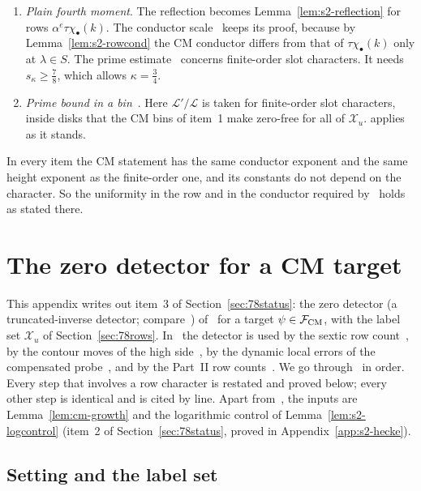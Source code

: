 \documentclass[11pt]{article}
\numberwithin{equation}{section}
\begin{document}
\begin{enumerate}
 functional equation of the finite-order numerator. They are unchanged.
\item \emph{Plain fourth moment}. The reflection \cite[Section~18.1]{OAI78} becomes Lemma~\ref{lem:s2-reflection} for rows
 $\alpha^e\tau\chi_\bullet(k)$. The conductor scale~\cite[eq.~(18.7)]{OAI78} keeps its proof, because by
 Lemma~\ref{lem:s2-rowcond} the CM conductor differs from that of $\tau\chi_\bullet(k)$ only at $\lambda\in S$.
 The prime estimate~\cite[eq.~(18.11)]{OAI78} concerns finite-order slot characters. It needs
 $s_\kappa\ge\frac78$, which allows $\kappa=\frac34$.
\item \emph{Prime bound in a bin}~\cite[Lemma~19.1 and its proof]{OAI78}. Here
 $\mathcal L'/\mathcal L$ is taken for finite-order slot characters, inside disks that the CM bins of item~1 make
 zero-free for all of $\mathcal X_u$. \cite[Lemma~4.9]{OAI78} applies as it stands.
\end{enumerate}
In every item the CM statement has the same conductor exponent and the same height exponent as the
finite-order one, and its constants do not depend on the character. So the uniformity in the row and in the
conductor required by~\cite{OAI78} holds as stated there.

\section{The zero detector for a CM target}\label{app:s3-detector}

This appendix writes out item~3 of Section~\ref{sec:78status}: the zero detector (a truncated-inverse detector; compare~\cite[Appendix~C]{MP24})
of~\cite[Section~8]{OAI78} for a target $\psi\in\mathcal F_{\rm CM}$, with the
label set $\mathcal X_u$ of Section~\ref{sec:78rows}. In~\cite{OAI78} the detector is used by the
sextic row count~\cite[Prop.~9.2]{OAI78}, by the contour moves of the high
side~\cite[Lemma~10.3]{OAI78}, by the dynamic local errors of the compensated
probe~\cite[Section~16.2]{OAI78}, and by the Part~II row counts~\cite[Section~19]{OAI78}.
We go through~\cite[Section~8]{OAI78} in order. Every step that involves a row character is
restated and proved below; every other step is identical and is cited by line. Apart
from~\cite{OAI78}, the inputs are Lemma~\ref{lem:cm-growth} and the logarithmic control of
Lemma~\ref{lem:s2-logcontrol} (item~2 of Section~\ref{sec:78status}, proved in Appendix~\ref{app:s2-hecke}).

\subsection{Setting and the label set}
\end{document}
